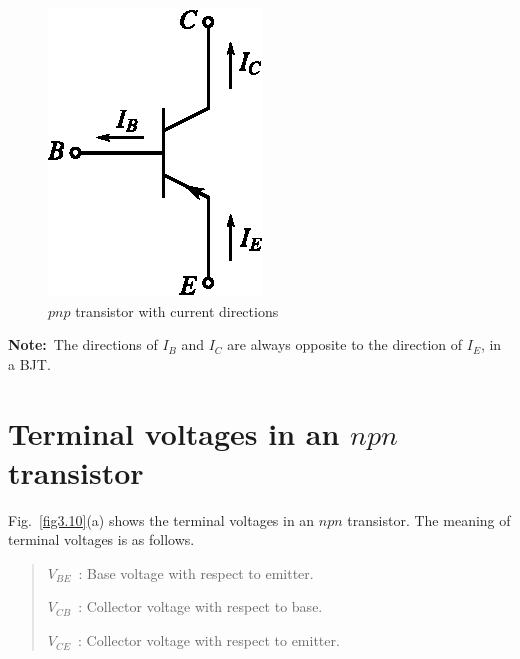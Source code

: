 \begin{figure}[H]
\centering
\includegraphics{chap2/fig2.9.eps}
\caption{$pnp$ transistor with current directions}\label{fig3.9}
\end{figure}

\noindent
{\bf Note:}~The directions of $I_{B}$ and $I_{C}$ are always opposite to the direction of $I_{E}$, in a BJT.

\section[Terminal voltages in an $npn$ transistor]{Terminal voltages in an \boldmath$npn$ transistor}\label{sec3.6}

Fig.~\ref{fig3.10}(a) shows the terminal voltages in an $npn$ transistor. The meaning of terminal voltages is as follows.
\begin{quote}
$V_{BE}$~: Base voltage with respect to emitter.

$V_{CB}$~: Collector voltage with respect to base.

$V_{CE}$~: Collector voltage with respect to emitter.
\end{quote}

